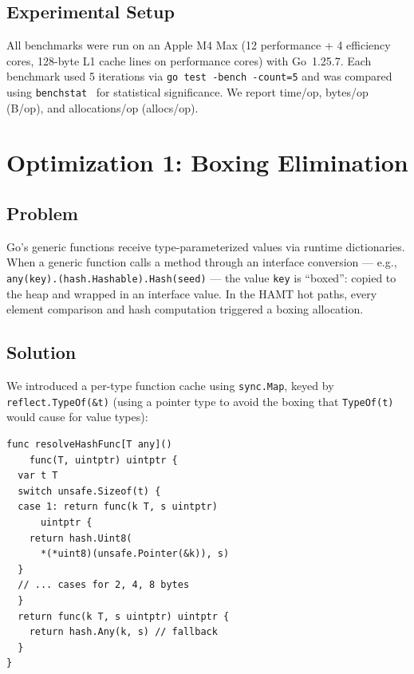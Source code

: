 \documentclass[11pt,twocolumn]{article}
\begin{document}
\subsection{Experimental Setup}

All benchmarks were run on an Apple M4 Max (12 performance + 4 efficiency
cores, 128-byte L1 cache lines on performance cores) with Go~1.25.7.
Each benchmark used 5 iterations via \texttt{go test -bench -count=5} and
was compared using \texttt{benchstat}~\cite{benchstat} for statistical
significance.
We report time/op, bytes/op (B/op), and allocations/op (allocs/op).

\section{Optimization 1: Boxing Elimination}
\label{sec:boxing}

\subsection{Problem}

Go's generic functions receive type-parameterized values via runtime
dictionaries.
When a generic function calls a method through an interface conversion ---
e.g., \texttt{any(key).(hash.Hashable).Hash(seed)} --- the value \texttt{key}
is ``boxed'': copied to the heap and wrapped in an interface value.
In the HAMT hot paths, every element comparison and hash computation
triggered a boxing allocation.

\subsection{Solution}

We introduced a per-type function cache using \texttt{sync.Map}, keyed by
\texttt{reflect.TypeOf(\&t)} (using a pointer type to avoid the boxing that
\texttt{TypeOf(t)} would cause for value types):

\begin{verbatim}
func resolveHashFunc[T any]()
    func(T, uintptr) uintptr {
  var t T
  switch unsafe.Sizeof(t) {
  case 1: return func(k T, s uintptr)
      uintptr {
    return hash.Uint8(
      *(*uint8)(unsafe.Pointer(&k)), s)
  }
  // ... cases for 2, 4, 8 bytes
  }
  return func(k T, s uintptr) uintptr {
    return hash.Any(k, s) // fallback
  }
}
\end{verbatim}
\end{document}
